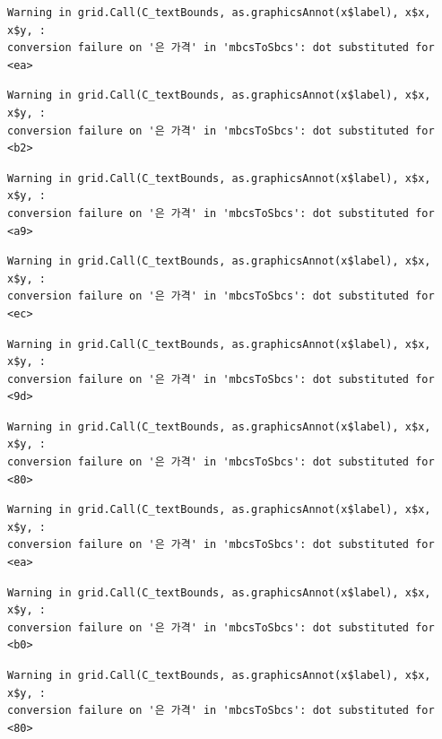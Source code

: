 \documentclass[
  letterpaper,
  DIV=11,
  numbers=noendperiod]{scrreprt}
\begin{document}
\begin{verbatim}
Warning in grid.Call(C_textBounds, as.graphicsAnnot(x$label), x$x, x$y, :
conversion failure on '은 가격' in 'mbcsToSbcs': dot substituted for <ea>
\end{verbatim}

\begin{verbatim}
Warning in grid.Call(C_textBounds, as.graphicsAnnot(x$label), x$x, x$y, :
conversion failure on '은 가격' in 'mbcsToSbcs': dot substituted for <b2>
\end{verbatim}

\begin{verbatim}
Warning in grid.Call(C_textBounds, as.graphicsAnnot(x$label), x$x, x$y, :
conversion failure on '은 가격' in 'mbcsToSbcs': dot substituted for <a9>
\end{verbatim}

\begin{verbatim}
Warning in grid.Call(C_textBounds, as.graphicsAnnot(x$label), x$x, x$y, :
conversion failure on '은 가격' in 'mbcsToSbcs': dot substituted for <ec>
\end{verbatim}

\begin{verbatim}
Warning in grid.Call(C_textBounds, as.graphicsAnnot(x$label), x$x, x$y, :
conversion failure on '은 가격' in 'mbcsToSbcs': dot substituted for <9d>
\end{verbatim}

\begin{verbatim}
Warning in grid.Call(C_textBounds, as.graphicsAnnot(x$label), x$x, x$y, :
conversion failure on '은 가격' in 'mbcsToSbcs': dot substituted for <80>
\end{verbatim}

\begin{verbatim}
Warning in grid.Call(C_textBounds, as.graphicsAnnot(x$label), x$x, x$y, :
conversion failure on '은 가격' in 'mbcsToSbcs': dot substituted for <ea>
\end{verbatim}

\begin{verbatim}
Warning in grid.Call(C_textBounds, as.graphicsAnnot(x$label), x$x, x$y, :
conversion failure on '은 가격' in 'mbcsToSbcs': dot substituted for <b0>
\end{verbatim}

\begin{verbatim}
Warning in grid.Call(C_textBounds, as.graphicsAnnot(x$label), x$x, x$y, :
conversion failure on '은 가격' in 'mbcsToSbcs': dot substituted for <80>
\end{verbatim}
\end{document}
